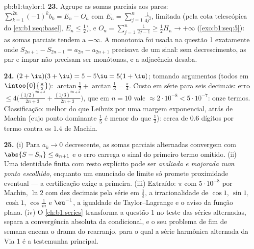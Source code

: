 \begin{solution}{pb:b1:taylor:1}
\textbf{23.} Agrupe as somas parciais aos pares: $\sum_{k=1}^{2n}
(-1)^k b_k = E_n - O_n$ com $E_n = \sum_{j=1}^{n}
\frac{1}{4j^2}$,
limitada (pela cota telescópica do \cref{ex:b1:seq:basel}, $E_n \leq \frac12$), e $O_n =
\sum_{j=1}^{n}\frac{1}{2j-1} \geq \frac12 H_n \to +\infty$
(\cref{exo:b1:seq:5}): as somas parciais tendem a $-\infty$.
A monotonia foi usada na questão 1 exatamente onde $S_{2n+1} -
S_{2n-1} = a_{2n} - a_{2n+1}$ precisava de
um sinal: sem decrescimento, as  par e ímpar não
precisam ser monótonas, e a adjacência desaba.

\textbf{24.} $(2+\iu)(3+\iu) = 5 + 5\iu = 5(1+\iu)$; tomando
argumentos (todos em $\intoo{0}{\frac\pi2}$): $\arctan\frac12 +
\arctan\frac13 = \frac\pi4$. Custo em série para seis
decimais: erro $\leq 4\bigl(\frac{(1/2)^{2n+3}}{2n+3} +
\frac{(1/3)^{2n+3}}{2n+3}\bigr)$, que em $n = 10$ vale
$\approx 2\cdot10^{-8} < 5\cdot10^{-7}$: onze termos. Classificação:
melhor do que Leibniz por uma margem exponencial, atrás de Machin
(cujo ponto dominante $\frac15$ é menor do que $\frac12$): cerca de
$0.6$ dígitos por termo contra os $1.4$ de Machin.

\textbf{25.} (i) Para $a_k \to 0$ decrescente, as somas parciais alternadas
convergem com $\abs{S - S_n} \leq a_{n+1}$ e o erro carrega o sinal do primeiro termo
omitido. (ii) Uma identidade finita com resto explícito pode ser
\emph{avaliada e majorada num ponto escolhido}, enquanto um
enunciado de limite só promete proximidade eventual --- a
certificação exige a primeira. (iii) Extraído: $\pi$ com $5\cdot10^{-8}$ por
Machin, $\ln 2$ com dez decimais pela série em $\frac13$, a
irracionalidade de $\cos 1$, $\sin 1$, $\cosh 1$, $\cos\frac1m$ e $\eu^{-1}$, a
igualdade de Taylor--Lagrange e o aviso da função plana. (iv)
O \cref{ch:b1:series} transforma a questão 1 no teste das séries
alternadas, separa a convergência absoluta da condicional,
e o seu problema de fim de semana encena o drama do rearranjo,
para o qual a série harmônica alternada da Via 1 é a
testemunha principal.
\end{solution}

